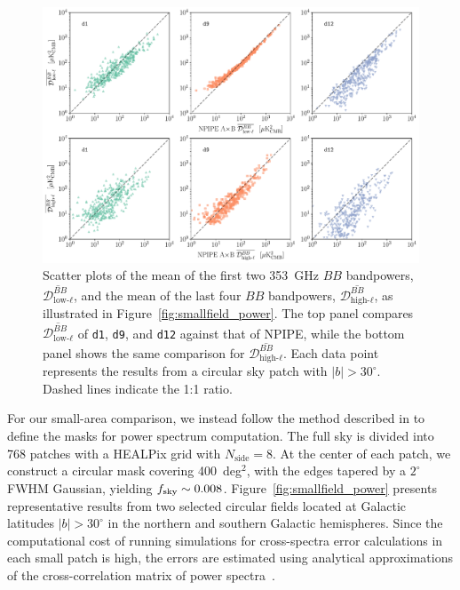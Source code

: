 \documentclass[twocolumn]{aastex631}
\begin{document}
\begin{figure}
    \centering
    \includegraphics[width=2.1\columnwidth]{figures/llmean_hlmean_comparison.pdf}
    \caption{Scatter plots of the mean of the first two 353~GHz $BB$ bandpowers, $\overline{\mathcal{D}_{\text{low-}\ell}^{BB}}$, and the mean of the last four $BB$ bandpowers, $\overline{\mathcal{D}_{\text{high-}\ell}^{BB}}$, as illustrated in Figure~\ref{fig:smallfield_power}. The top panel compares $\overline{\mathcal{D}_{\text{low-}\ell}^{BB}}$ of \texttt{d1}, \texttt{d9}, and \texttt{d12} against that of NPIPE, while the bottom panel shows the same comparison for $\overline{\mathcal{D}_{\text{high-}\ell}^{BB}}$. Each data point represents the results from a circular sky patch with $|b| > 30^\circ$. Dashed lines indicate the 1:1 ratio.}
    \label{fig:smallfield_power_all}
\end{figure}

For our small-area comparison, we instead follow the method described in \cite{planck2014-XXX} to define the masks for power spectrum computation. The full sky is divided into 768 patches with a HEALPix grid with $N_\text{side} = 8$. At the center of each patch, we construct a circular mask covering 400~deg$^2$, with the edges tapered by a $2^\circ$ FWHM Gaussian, yielding $f_{\rm sky} \sim 0.008$. Figure~\ref{fig:smallfield_power} presents representative results from two selected circular fields located at Galactic latitudes $|b| > 30^\circ$ in the northern and southern Galactic hemispheres. Since the computational cost of running simulations for cross-spectra error calculations in each small patch is high, the errors are estimated using analytical approximations of the cross-correlation matrix of power spectra~\citep{Tristram:2005}.
\end{document}
